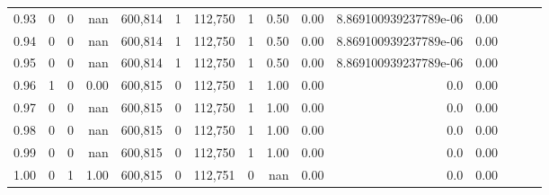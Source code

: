 \begin{tabular}{rrrrrrrrrrrrrrr}
0.93 &       0 &      0 &   nan &  600,814 &        1 &  112,750 &        1 &  0.50 &  0.00 &   8.869100939237789e-06 &      0.00 \\
0.94 &       0 &      0 &   nan &  600,814 &        1 &  112,750 &        1 &  0.50 &  0.00 &   8.869100939237789e-06 &      0.00 \\
0.95 &       0 &      0 &   nan &  600,814 &        1 &  112,750 &        1 &  0.50 &  0.00 &   8.869100939237789e-06 &      0.00 \\
0.96 &       1 &      0 &  0.00 &  600,815 &        0 &  112,750 &        1 &  1.00 &  0.00 &                     0.0 &      0.00 \\
0.97 &       0 &      0 &   nan &  600,815 &        0 &  112,750 &        1 &  1.00 &  0.00 &                     0.0 &      0.00 \\
0.98 &       0 &      0 &   nan &  600,815 &        0 &  112,750 &        1 &  1.00 &  0.00 &                     0.0 &      0.00 \\
0.99 &       0 &      0 &   nan &  600,815 &        0 &  112,750 &        1 &  1.00 &  0.00 &                     0.0 &      0.00 \\
1.00 &       0 &      1 &  1.00 &  600,815 &        0 &  112,751 &        0 &   nan &  0.00 &                     0.0 &      0.00 \\
\bottomrule
\end{tabular}
